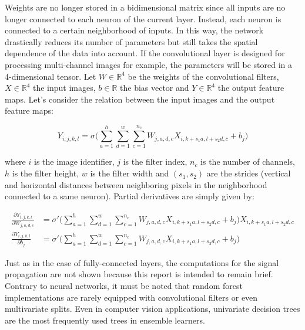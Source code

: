         Weights are no longer stored in a bidimensional matrix since all inputs are no longer connected to each neuron of the current layer.
        Instead, each neuron is connected to a certain neighborhood of inputs. In this way, the network drastically reduces its number of parameters
        but still takes the spatial dependence of the data into account. If the convolutional layer is designed for processing multi-channel images for example,
        the parameters will be stored in a 4-dimensional tensor. Let $W \in \mathbb{R}^4$ be the weights of the convolutional filters,
        $X \in \mathbb{R}^4$ the input images, $b \in \mathbb{R}$ the bias vector and $Y \in \mathbb{R}^4$ the output feature maps.
        Let's consider the relation between the input images and the output feature maps:

        \begin{equation} \label{eq:conv2D}
            Y_{i, j, k, l} = \sigma \Big( \sum\limits_{a=1}^h \sum\limits_{d=1}^w \sum\limits_{c=1}^{n_c} W_{j, a, d, c} X_{i, k+s_1 a, l+s_2 d, c} + b_{j} \Big) 
        \end{equation}

            where $i$ is the image identifier, $j$ is the filter index, $n_c$ is the number of channels, $h$ is the filter height, $w$ is the filter width
            and $(s_1, s_2)$ are the strides (vertical and horizontal distances between neighboring pixels in the neighborhood connected to a same neuron).
            Partial derivatives are simply given by:

        \begin{align}
            \frac{\partial Y_{i, j, k, l}}{\partial W_{j, a, d, c}} & = 
                \sigma' \Big( \sum\limits_{a=1}^h \sum\limits_{d=1}^w \sum\limits_{c=1}^{n_c} W_{j, a, d, c}
                X_{i, k+s_1 a, l+s_2 d, c} + b_{j} \Big) X_{i, k+s_1 a, l+s_2 d, c} \\
            \frac{\partial Y_{i, j, k, l}}{\partial b_{j}} & =
                \sigma' \Big( \sum\limits_{a=1}^h \sum\limits_{d=1}^w \sum\limits_{c=1}^{n_c} W_{j, a, d, c}
                X_{i, k+s_1 a, l+s_2 d, c} + b_{j} \Big)
        \end{align}

        Just as in the case of fully-connected layers, the computations for the signal propagation are not shown because this report is intended to remain brief.
        Contrary to neural networks, it must be noted that random forest implementations are rarely equipped with convolutional filters or even multivariate 
        splits. Even in computer vision applications, univariate decision trees are the most frequently used trees in ensemble learners.

